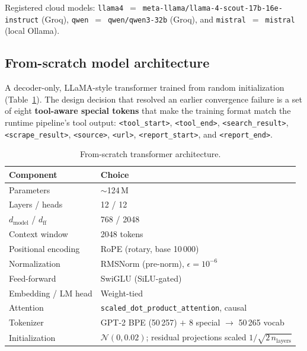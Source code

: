 \documentclass[11pt,a4paper]{article}
\newcommand{\tok}[1]{\texttt{\textless\textbar #1\textbar\textgreater}}
\begin{document}
\noindent
Registered cloud models: \texttt{llama4}~$=$~\texttt{meta-llama/llama-4-scout-17b-16e-instruct}
(Groq), \texttt{qwen}~$=$~\texttt{qwen/qwen3-32b} (Groq), and
\texttt{mistral}~$=$~\texttt{mistral} (local Ollama).

\subsection{From-scratch model architecture}
\begin{sloppypar}
A decoder-only, LLaMA-style transformer trained from random initialization
(Table~\ref{tab:arch}). The design decision that resolved an earlier
convergence failure is a set of eight \textbf{tool-aware special tokens} that
make the training format match the runtime pipeline's tool output:
\tok{tool\_start}, \tok{tool\_end}, \tok{search\_result},
\tok{scrape\_result}, \tok{source}, \tok{url}, \tok{report\_start}, and
\tok{report\_end}.
\end{sloppypar}

\begin{table}[h]
\centering
\caption{From-scratch transformer architecture.}
\label{tab:arch}
\small
\begin{tabular}{@{}ll@{}}
\toprule
\textbf{Component} & \textbf{Choice} \\
\midrule
Parameters            & $\sim$124\,M \\
Layers / heads        & 12 / 12 \\
$d_\text{model}$ / $d_\text{ff}$ & 768 / 2048 \\
Context window        & 2048 tokens \\
Positional encoding   & RoPE (rotary, base 10\,000) \\
Normalization         & RMSNorm (pre-norm), $\epsilon = 10^{-6}$ \\
Feed-forward          & SwiGLU (SiLU-gated) \\
Embedding / LM head    & Weight-tied \\
Attention             & \texttt{scaled\_dot\_product\_attention}, causal \\
Tokenizer             & GPT-2 BPE (50\,257) $+$ 8 special $\to$ 50\,265 vocab \\
Initialization        & $\mathcal{N}(0,0.02)$; residual projections scaled $1/\sqrt{2\,n_\text{layers}}$ \\
\bottomrule
\end{tabular}
\end{table}
\end{document}
